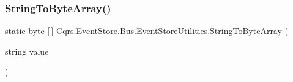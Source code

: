 \subsubsection{\texorpdfstring{String\+To\+Byte\+Array()}{StringToByteArray()}}
{\footnotesize\ttfamily static byte \mbox{[}$\,$\mbox{]} Cqrs.\+Event\+Store.\+Bus.\+Event\+Store\+Utilities.\+String\+To\+Byte\+Array (\begin{DoxyParamCaption}\item[{string}]{value }\end{DoxyParamCaption})\hspace{0.3cm}{\ttfamily [static]}}

